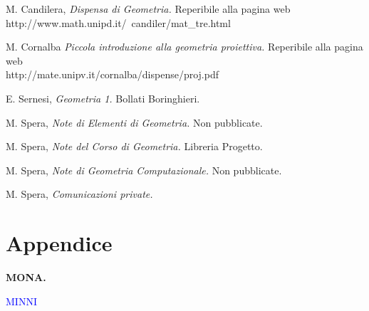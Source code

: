 \newpage

{\small
\begin{thebibliography}{99}

 M. Candilera, {\it Dispensa di Geometria.} Reperibile 
alla pagina web 
http://www.math.unipd.it/~candiler/mat\_tre.html

 M. Cornalba {\it Piccola introduzione alla geometria 
proiettiva.}
Reperibile alla pagina web \\
http://mate.unipv.it/cornalba/dispense/proj.pdf

 E. Sernesi, {\it Geometria 1.} Bollati Boringhieri.

 M. Spera, {\it Note di Elementi di Geometria.} Non 
pubblicate.

 M. Spera, {\it Note del Corso di Geometria.} Libreria 
Progetto.

 M. Spera, {\it Note di Geometria Computazionale.} Non 
pubblicate.

 M. Spera, {\it Comunicazioni private.}


\end{thebibliography}
}




\section*{Appendice}

\begin{center}\textcolor[rgb]{0.50,0.20,0.50}{\bf MONA.} \end{center}

\textcolor{blue}{\begin{NB}
  MINNI
\end{NB}}

\begin{comment}  
  \begin{itemize}
  \item {\it {\small PIPPO 
  \item PLUTO}}
  \end{itemize}
\end{comment}


  



 

